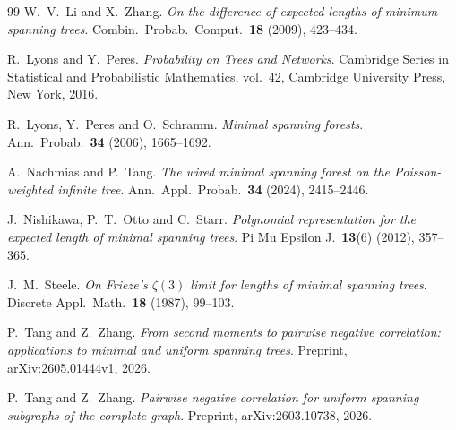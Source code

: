 \documentclass[11pt,a4paper]{amsart}
\theoremstyle{plain}
\theoremstyle{definition}
\theoremstyle{remark}
\begin{document}
\begin{thebibliography}{99}
W.~V.~Li and X.~Zhang.
\emph{On the difference of expected lengths of minimum spanning trees}.
Combin.\ Probab.\ Comput.\ \textbf{18} (2009), 423--434.

R.~Lyons and Y.~Peres.
\emph{Probability on Trees and Networks}.
Cambridge Series in Statistical and Probabilistic Mathematics, vol.~42,
Cambridge University Press, New York, 2016.

R.~Lyons, Y.~Peres and O.~Schramm.
\emph{Minimal spanning forests}.
Ann.\ Probab.\ \textbf{34} (2006), 1665--1692.

A.~Nachmias and P.~Tang.
\emph{The wired minimal spanning forest on the Poisson-weighted infinite tree}.
Ann.\ Appl.\ Probab.\ \textbf{34} (2024), 2415--2446.

J.~Nishikawa, P.~T.~Otto and C.~Starr.
\emph{Polynomial representation for the expected length of minimal spanning
trees}.
Pi Mu Epsilon J.\ \textbf{13}(6) (2012), 357--365.

J.~M.~Steele.
\emph{On Frieze's $\zeta(3)$ limit for lengths of minimal spanning trees}.
Discrete Appl.\ Math.\ \textbf{18} (1987), 99--103.

P.~Tang and Z.~Zhang.
\emph{From second moments to pairwise negative correlation: applications to
minimal and uniform spanning trees}.
Preprint, arXiv:2605.01444v1, 2026.

P.~Tang and Z.~Zhang.
\emph{Pairwise negative correlation for uniform spanning subgraphs of the
complete graph}.
Preprint, arXiv:2603.10738, 2026.

\end{thebibliography}
\end{document}
